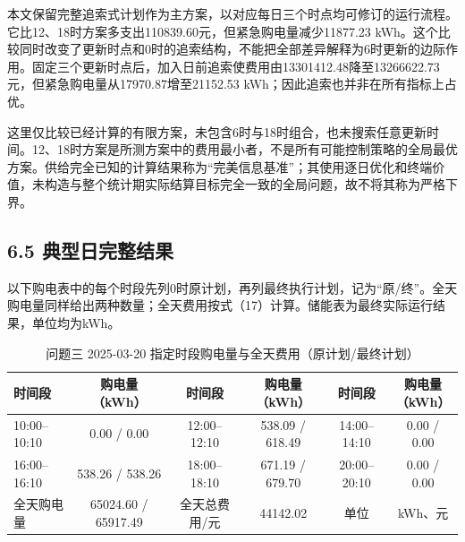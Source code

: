 \documentclass[UTF8,a4paper,zihao=-4,fontset=windows]{ctexart}
\begin{document}
\par
本文保留完整追索式计划作为主方案，以对应每日三个时点均可修订的运行流程。它比12、18时方案多支出110839.60元，但紧急购电量减少11877.23 kWh。这个比较同时改变了更新时点和0时的追索结构，不能把全部差异解释为6时更新的边际作用。固定三个更新时点后，加入日前追索使费用由13301412.48降至13266622.73元，但紧急购电量从17970.87增至21152.53 kWh；因此追索也并非在所有指标上占优。
\par
这里仅比较已经计算的有限方案，未包含6时与18时组合，也未搜索任意更新时间。12、18时方案是所测方案中的费用最小者，不是所有可能控制策略的全局最优方案。供给完全已知的计算结果称为“完美信息基准”；其使用逐日优化和终端价值，未构造与整个统计期实际结算目标完全一致的全局问题，故不将其称为严格下界。
\par
\subsection{6.5 典型日完整结果}
以下购电表中的每个时段先列0时原计划，再列最终执行计划，记为“原/终”。全天购电量同样给出两种数量；全天费用按式（17）计算。储能表为最终实际运行结果，单位均为kWh。
\par
\begin{table}[H]\centering
\fontsize{9.5}{12}\selectfont\setlength{\tabcolsep}{4pt}\renewcommand{\arraystretch}{1.12}
\begin{adjustbox}{max width=\linewidth}\begin{tabular}{lccccc}\toprule
\textbf{时间段} & \shortstack{\textbf{购电量}\\{\normalfont （kWh）}} & \textbf{时间段} & \shortstack{\textbf{购电量}\\{\normalfont （kWh）}} & \textbf{时间段} & \shortstack{\textbf{购电量}\\{\normalfont （kWh）}}\\\midrule
10:00–10:10 & 0.00 / 0.00 & 12:00–12:10 & 538.09 / 618.49 & 14:00–14:10 & 0.00 / 0.00\\
16:00–16:10 & 538.26 / 538.26 & 18:00–18:10 & 671.19 / 679.70 & 20:00–20:10 & 0.00 / 0.00\\
全天购电量 & 65024.60 / 65917.49 & 全天总费用/元 & 44142.02 & 单位 & kWh、元\\
\bottomrule\end{tabular}\end{adjustbox}
\caption{问题三 2025-03-20 指定时段购电量与全天费用（原计划/最终计划）}
\end{table}
\end{document}
